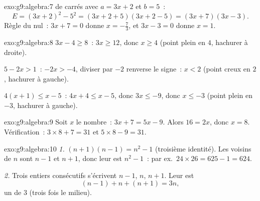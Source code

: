 \begin{solution}{exo:g9:algebra:7}
 de carrés avec $a = 3x + 2$ et $b = 5$~:
\[
E = (3x + 2)^2 - 5^2 = (3x + 2 + 5)(3x + 2 - 5) = (3x + 7)(3x - 3).
\]
Règle du  nul~: $3x + 7 = 0$ donne $x = -\frac73$, et
$3x - 3 = 0$ donne $x = 1$.
\end{solution}

\begin{solution}{exo:g9:algebra:8}
$3x - 4 \geq 8$~: $3x \geq 12$, donc $x \geq 4$ (point plein en $4$,
hachurer à droite).

$5 - 2x > 1$~: $-2x > -4$, diviser par $-2$ renverse le signe~: $x < 2$
(point creux en $2$, hachurer à gauche).

$4(x+1) \leq x - 5$~: $4x + 4 \leq x - 5$, donc $3x \leq -9$, donc
$x \leq -3$ (point plein en $-3$, hachurer à gauche).
\end{solution}

\begin{solution}{exo:g9:algebra:9}
Soit $x$ le nombre~: $3x + 7 = 5x - 9$. Alors $16 = 2x$, donc $x = 8$.
Vérification~: $3 \times 8 + 7 = 31$ et $5 \times 8 - 9 = 31$.
\end{solution}

\begin{solution}{exo:g9:algebra:10}
\emph{1.} $(n+1)(n-1) = n^2 - 1$ (troisième identité). Les voisins de
$n$ sont $n - 1$ et $n + 1$, donc leur  est $n^2 - 1$~: par ex.\
$24 \times 26 = 625 - 1 = 624$.

\emph{2.} Trois entiers consécutifs s'écrivent $n - 1$, $n$, $n + 1$.
Leur \omterm{def:g1:addition:def}{somme} est
\[
(n-1) + n + (n+1) = 3n ,
\]
un  de $3$ (trois fois le milieu).
\end{solution}

